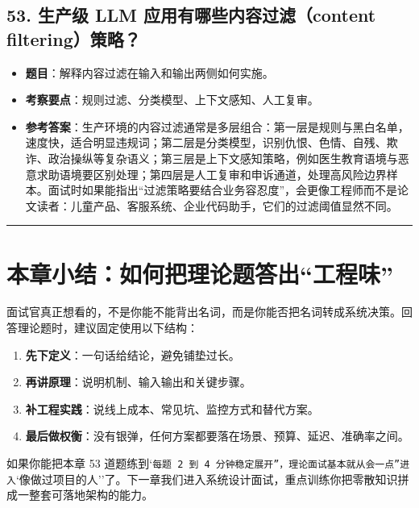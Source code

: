 \subsection{53. 生产级 LLM 应用有哪些内容过滤（content filtering）策略？}
\begin{itemize}[leftmargin=2em]
\item \textbf{题目}：解释内容过滤在输入和输出两侧如何实施。
\item \textbf{考察要点}：规则过滤、分类模型、上下文感知、人工复审。
\item \textbf{参考答案}：生产环境的内容过滤通常是多层组合：第一层是规则与黑白名单，速度快，适合明显违规词；第二层是分类模型，识别仇恨、色情、自残、欺诈、政治操纵等复杂语义；第三层是上下文感知策略，例如医生教育语境与恶意求助语境要区别处理；第四层是人工复审和申诉通道，处理高风险边界样本。面试时如果能指出``过滤策略要结合业务容忍度''，会更像工程师而不是论文读者：儿童产品、客服系统、企业代码助手，它们的过滤阈值显然不同。
\end{itemize}

\bigskip\hrule\bigskip

\section{本章小结：如何把理论题答出``工程味''}

面试官真正想看的，不是你能不能背出名词，而是你能否把名词转成系统决策。回答理论题时，建议固定使用以下结构：


\begin{enumerate}[leftmargin=2em]
\item \textbf{先下定义}：一句话给结论，避免铺垫过长。
\item \textbf{再讲原理}：说明机制、输入输出和关键步骤。
\item \textbf{补工程实践}：说线上成本、常见坑、监控方式和替代方案。
\item \textbf{最后做权衡}：没有银弹，任何方案都要落在场景、预算、延迟、准确率之间。
\end{enumerate}

如果你能把本章 53 道题练到`\texttt{每题 2 到 4 分钟稳定展开''，理论面试基本就从}\texttt{会一点''进入}`像做过项目的人''了。下一章我们进入系统设计面试，重点训练你把零散知识拼成一整套可落地架构的能力。
